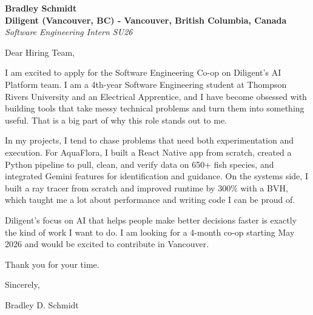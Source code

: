 \documentclass[11pt]{article}
\begin{document}
\textbf{Bradley Schmidt}\\
\vspace{0.5em}
\textbf{Diligent (Vancouver, BC) - Vancouver, British Columbia, Canada}\\
\textit{Software Engineering Intern SU26}

Dear Hiring Team,

\par

I am excited to apply for the Software Engineering Co-op on Diligent's AI Platform team. I am a 4th-year Software Engineering student at Thompson Rivers University and an Electrical Apprentice, and I have become obsessed with building tools that take messy technical problems and turn them into something useful. That is a big part of why this role stands out to me.

\par

In my projects, I tend to chase problems that need both experimentation and execution. For AquaFlora, I built a React Native app from scratch, created a Python pipeline to pull, clean, and verify data on 650+ fish species, and integrated Gemini features for identification and guidance. On the systems side, I built a ray tracer from scratch and improved runtime by 300\% with a BVH, which taught me a lot about performance and writing code I can be proud of.

\par

Diligent's focus on AI that helps people make better decisions faster is exactly the kind of work I want to do. I am looking for a 4-month co-op starting May 2026 and would be excited to contribute in Vancouver.

\par

Thank you for your time.

\par

Sincerely,

\par

Bradley D. Schmidt
\end{document}
